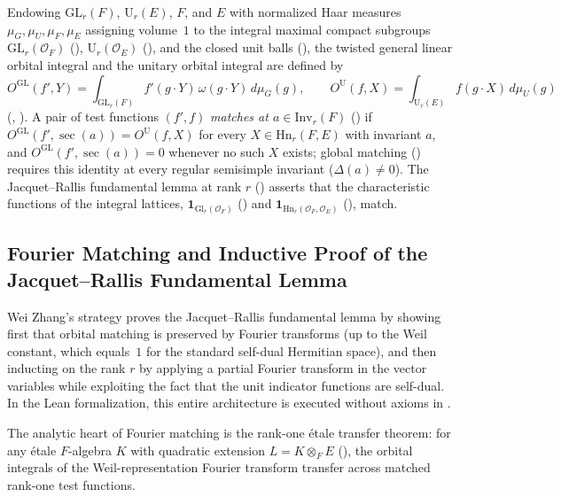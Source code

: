 Endowing $\mathrm{GL}_r(F)$, $\mathrm{U}_r(E)$, $F$, and $E$ with normalized
Haar measures $\mu_G, \mu_U, \mu_F, \mu_E$ assigning volume~$1$ to the
integral maximal compact subgroups $\mathrm{GL}_r(\mathcal{O}_F)$
(), $\mathrm{U}_r(\mathcal{O}_E)$
(), and the closed unit balls
(), the twisted general linear orbital integral
and the unitary orbital integral are defined by
\[
  O^{\mathrm{GL}}(f', Y)
  = \int_{\mathrm{GL}_r(F)} f'(g \cdot Y)\,\omega(g \cdot Y)\, d\mu_G(g),
  \qquad
  O^{\mathrm{U}}(f, X)
  = \int_{\mathrm{U}_r(E)} f(g \cdot X)\, d\mu_U(g)
\]
(, ).
A pair of test functions $(f', f)$ \emph{matches at $a \in \mathrm{Inv}_r(F)$}
() if
$O^{\mathrm{GL}}(f', \operatorname{sec}(a)) = O^{\mathrm{U}}(f, X)$ for every
$X \in \mathrm{Hn}_r(F, E)$ with invariant $a$, and
$O^{\mathrm{GL}}(f', \operatorname{sec}(a)) = 0$ whenever no such $X$ exists;
global matching () requires this identity at
every regular semisimple invariant ($\Delta(a) \neq 0$).
The Jacquet--Rallis fundamental lemma at rank $r$
() asserts that the characteristic
functions of the integral lattices, $\mathbf{1}_{\mathrm{Gl}_r(\mathcal{O}_F)}$
() and $\mathbf{1}_{\mathrm{Hn}_r(\mathcal{O}_F, \mathcal{O}_E)}$
(), match.

\subsection{Fourier Matching and Inductive Proof of the Jacquet--Rallis Fundamental Lemma}
\label{subsec:ch03-jr-proof}

Wei Zhang's strategy proves the Jacquet--Rallis fundamental lemma by showing
first that orbital matching is preserved by Fourier transforms (up to the Weil
constant, which equals~$1$ for the standard self-dual Hermitian space), and
then inducting on the rank $r$ by applying a partial Fourier transform in the
vector variables while exploiting the fact that the unit indicator functions
are self-dual.
In the Lean formalization, this entire architecture is executed without axioms
in .

The analytic heart of Fourier matching is the rank-one \'etale transfer
theorem: for any \'etale $F$-algebra $K$ with quadratic extension
$L = K \otimes_F E$ (), the orbital integrals of
the Weil-representation Fourier transform transfer across matched rank-one
test functions.

